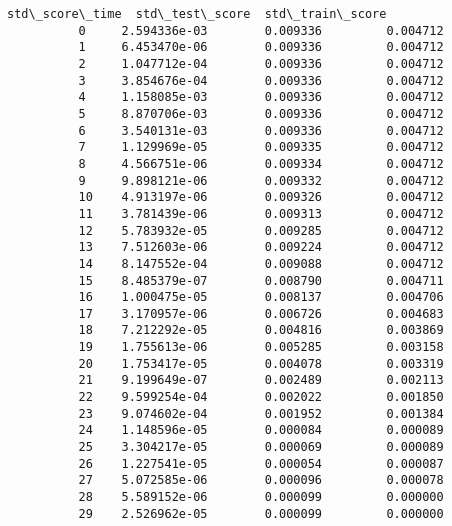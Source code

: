 \documentclass[11pt]{article}
\begin{document}
\begin{Verbatim}[commandchars=\\\{\}]
              std\_score\_time  std\_test\_score  std\_train\_score  
          0     2.594336e-03        0.009336         0.004712  
          1     6.453470e-06        0.009336         0.004712  
          2     1.047712e-04        0.009336         0.004712  
          3     3.854676e-04        0.009336         0.004712  
          4     1.158085e-03        0.009336         0.004712  
          5     8.870706e-03        0.009336         0.004712  
          6     3.540131e-03        0.009336         0.004712  
          7     1.129969e-05        0.009335         0.004712  
          8     4.566751e-06        0.009334         0.004712  
          9     9.898121e-06        0.009332         0.004712  
          10    4.913197e-06        0.009326         0.004712  
          11    3.781439e-06        0.009313         0.004712  
          12    5.783932e-05        0.009285         0.004712  
          13    7.512603e-06        0.009224         0.004712  
          14    8.147552e-04        0.009088         0.004712  
          15    8.485379e-07        0.008790         0.004711  
          16    1.000475e-05        0.008137         0.004706  
          17    3.170957e-06        0.006726         0.004683  
          18    7.212292e-05        0.004816         0.003869  
          19    1.755613e-06        0.005285         0.003158  
          20    1.753417e-05        0.004078         0.003319  
          21    9.199649e-07        0.002489         0.002113  
          22    9.599254e-04        0.002022         0.001850  
          23    9.074602e-04        0.001952         0.001384  
          24    1.148596e-05        0.000084         0.000089  
          25    3.304217e-05        0.000069         0.000089  
          26    1.227541e-05        0.000054         0.000087  
          27    5.072585e-06        0.000096         0.000078  
          28    5.589152e-06        0.000099         0.000000  
          29    2.526962e-05        0.000099         0.000000  
\end{Verbatim}
        
\end{document}
